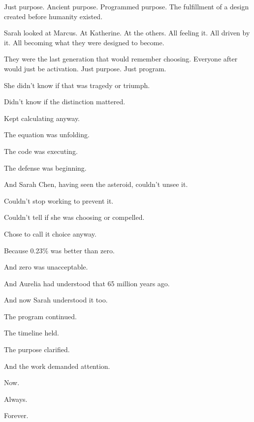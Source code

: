 Just purpose. Ancient purpose. Programmed purpose. The fulfillment of a design created before humanity existed.

Sarah looked at Marcus. At Katherine. At the others. All feeling it. All driven by it. All becoming what they were designed to become.

They were the last generation that would remember choosing. Everyone after would just be activation. Just purpose. Just program.

She didn't know if that was tragedy or triumph.

Didn't know if the distinction mattered.

Kept calculating anyway.

The equation was unfolding.

The code was executing.

The defense was beginning.

And Sarah Chen, having seen the asteroid, couldn't unsee it.

Couldn't stop working to prevent it.

Couldn't tell if she was choosing or compelled.

Chose to call it choice anyway.

Because 0.23\% was better than zero.

And zero was unacceptable.

And Aurelia had understood that 65 million years ago.

And now Sarah understood it too.

The program continued.

The timeline held.

The purpose clarified.

And the work demanded attention.

Now.

Always.

Forever.

